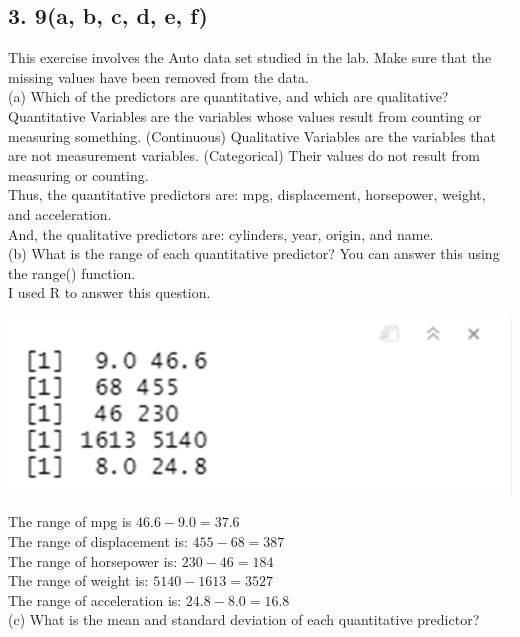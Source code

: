 \documentclass{article}
\begin{document}
\subsection*{3. 9(a, b, c, d, e, f)}
This exercise involves the Auto data set studied in the lab. Make sure that the missing values have been removed from the data. \\
\linebreak (a) Which of the predictors are quantitative, and which are qualitative? \\
\indent\indent Quantitative Variables are the variables whose values result from counting or measuring something. (Continuous) Qualitative Variables are the variables that are not measurement variables. (Categorical) Their values do not result from measuring or counting. \\
Thus, the quantitative predictors are: mpg, displacement, horsepower, weight, and acceleration. \\
And, the qualitative predictors are: cylinders, year, origin, and name. \\
\linebreak (b) What is the range of each quantitative predictor? You can answer this using the range() function. \\
\indent\indent I used R to answer this question. 
\begin{center}
\includegraphics[scale = 0.46]{3.9.b.png} \\
\end{center}
The range of mpg is $46.6 - 9.0 = 37.6$ \\
The range of displacement is: $455 - 68 = 387$ \\ 
The range of horsepower is: $230 - 46 = 184$ \\
The range of weight is: $5140 - 1613 = 3527$ \\
The range of acceleration is: $24.8 - 8.0 = 16.8$ \\
\linebreak (c) What is the mean and standard deviation of each quantitative predictor? \\
\end{document}
